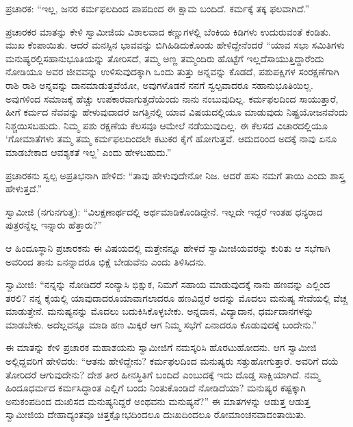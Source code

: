  ಪ್ರಚಾರಕ: “ಇಲ್ಲ, ಜನರ ಕರ್ಮಫಲದಿಂದ ಪಾಪದಿಂದ ಈ ಕ್ಷಾಮ ಬಂದಿದೆ. ಕರ್ಮಕ್ಕೆ ತಕ್ಕ ಫಲವಾಗಿದೆ.” 

 ಪ್ರಚಾರಕರ ಮಾತನ್ನು ಕೇಳಿ ಸ್ವಾಮೀಜಿಯ ವಿಶಾಲವಾದ ಕಣ್ಣುಗಳಲ್ಲಿ ಬೆಂಕಿಯ ಕಿಡಿಗಳು ಉದುರುವಂತೆ ಕಂಡಿತು. ಮುಖ ಕೆಂಪಾಯಿತು. ಆದರೆ ಮನಸ್ಸಿನ ಭಾವವನ್ನು ಬಿಗಿಹಿಡಿದುಕೊಂಡು ಹೇಳಿದ್ದೇನೆಂದರೆ “ಯಾವ ಸಭಾ ಸಮಿತಿಗಳು ಮನುಷ್ಯರಲ್ಲಿ\break ಸಹಾನುಭೂತಿಯನ್ನು ತೋರಿಸದೆ, ತಮ್ಮ ಅಣ್ಣ ತಮ್ಮಂದಿರು ಹೊಟ್ಟೆಗೆ ಇಲ್ಲದೆ\break ಸಾಯುತ್ತಿದ್ದಾರೆಂದು ನೋಡಿಯೂ ಅವರ ಜೀವವನ್ನು ಉಳಿಸುವುದಕ್ಕಾಗಿ ಒಂದು ತುತ್ತು ಅನ್ನವನ್ನು ಕೊಡದೆ, ಪಶುಪಕ್ಷಿಗಳ ಸಂರಕ್ಷಣೆಗಾಗಿ ರಾಶಿ ರಾಶಿ ಅನ್ನವನ್ನು ದಾನಮಾಡುತ್ತವೆಯೋ, ಅವುಗಳೊಡನೆ ನನಗೆ ಸ್ವಲ್ಪವಾದರೂ ಸಹಾನುಭೂತಿಯಿಲ್ಲ. ಅವುಗಳಿಂದ ಸಮಾಜಕ್ಕೆ ಹೆಚ್ಚು ಉಪಕಾರವಾಗುತ್ತದೆಯೆಂದು ನಾನು ನಂಬುವುದಿಲ್ಲ. ಕರ್ಮಫಲದಿಂದ ಸಾಯುತ್ತಾರೆ, ಹೀಗೆ ಕರ್ಮದ ನೆವವನ್ನು ಹೇಳುವುದಾದರೆ ಜಗತ್ತಿನಲ್ಲಿ ಯಾವ ವಿಷಯದಲ್ಲಿಯೂ ಮಾಡುವುದು ನಿಷ್ಪ್ರಯೋಜನವೆಂದು ನಿಶ್ಚಯಿಸಬಹುದು. ನಿಮ್ಮ ಪಶು ರಕ್ಷಣೆಯ ಕೆಲಸವೂ ಆಮೇಲೆ ನಡೆಯುವುದಿಲ್ಲ. ಈ ಕೆಲಸದ ವಿಚಾರದಲ್ಲಿಯೂ ‘ಗೋಮಾತೆಗಳು ತಮ್ಮ ತಮ್ಮ ಕರ್ಮಫಲದಿಂದಲೇ ಕಟುಕರ ಕೈಗೆ ಹೋಗುತ್ತವೆ. ಆದುದರಿಂದ ಅದಕ್ಕೆ ನಾವು ಏನೂ ಮಾಡಬೇಕಾದ ಆವಶ್ಯಕತೆ ಇಲ್ಲ’ ಎಂದು ಹೇಳಬಹುದು.” 

 ಪ್ರಚಾರಕನು ಸ್ವಲ್ಪ ಅಪ್ರತಿಭನಾಗಿ ಹೇಳಿದ: “ತಾವು ಹೇಳುವುದೇನೋ ನಿಜ. ಆದರೆ ಹಸು ನಮಗೆ ತಾಯಿ ಎಂದು ಶಾಸ್ತ್ರ ಹೇಳುತ್ತದೆ.” 

 ಸ್ವಾಮೀಜಿ (ನಗುನಗುತ್ತ): “ವಿಲಕ್ಷಣಾರ್ಥದಲ್ಲಿ ಅರ್ಥಮಾಡಿಕೊಂಡಿದ್ದೇನೆ. ಇಲ್ಲದೇ ಇದ್ದರೆ ಇಂತಹ ಧನ್ಯರಾದ ಪುತ್ರರನ್ನೆಲ್ಲ ಇನ್ನಾರು ಹೆತ್ತಾರು?” 

 ಆ ಹಿಂದೂಸ್ಥಾನಿ ಪ್ರಚಾರಕನು ಈ ವಿಷಯದಲ್ಲಿ ಮತ್ತೇನನ್ನೂ ಹೇಳದೆ ಸ್ವಾಮೀಜಿಯವರನ್ನು ಕುರಿತು ಆ ಸಭೆಗಾಗಿ ಅವರಿಂದ ತಾನು ಏನನ್ನಾದರೂ ಭಿಕ್ಷೆ ಬೇಡುವೆನು ಎಂದು ತಿಳಿಸಿದನು. 

 ಸ್ವಾಮೀಜಿ: “ನನ್ನನ್ನು ನೋಡಿದರೆ ಸಂನ್ಯಾಸಿ ಭಿಕ್ಷುಕ, ನಿಮಗೆ ಸಹಾಯ ಮಾಡುವುದಕ್ಕೆ ನಾನು ಹಣವನ್ನು ಎಲ್ಲಿಂದ ತರಲಿ? ನನ್ನ ಕೈಯಲ್ಲಿ ಯಾವುದಾದರೂ\break ಯಾವಾಗಲಾದರೂ ಹಣವಿದ್ದರೆ ಅದನ್ನು ಮೊದಲು ಮನುಷ್ಯ ಸೇವೆಯಲ್ಲಿ ವೆಚ್ಚ ಮಾಡುತ್ತೇನೆ. ಮನುಷ್ಯನನ್ನು ಮೊದಲು ಬದುಕಿಸಿಕೊಳ್ಳಬೇಕು. ಅನ್ನದಾನ, ವಿದ್ಯಾದಾನ, ಧರ್ಮದಾನಗಳನ್ನು ಮಾಡಬೇಕು. ಅದೆಲ್ಲವನ್ನೂ ಮಾಡಿ ಹಣ ಮಿಕ್ಕರೆ ಆಗ ನಿಮ್ಮ ಸಭೆಗೆ ಏನಾದರೂ ಕೊಡುವುದಕ್ಕೆ ಬಂದೇನು.” 

 ಈ ಮಾತನ್ನು ಕೇಳಿ ಪ್ರಚಾರಕ ಮಹಾಶಯನು ಸ್ವಾಮೀಜಿಗೆ ನಮಸ್ಕರಿಸಿ ಹೊರಟುಹೋದನು. ಆಗ ಸ್ವಾಮೀಜಿ ಅಲ್ಲಿದ್ದವರಿಗೆ ಹೇಳಿದರು: “ಆತನು ಹೇಳಿದ್ದೇನು? ಕರ್ಮಫಲದಿಂದ ಮನುಷ್ಯರು ಸತ್ತುಹೋಗುತ್ತಾರೆ. ಅವರಿಗೆ ದಯೆ ತೋರಿದರೆ ಆಗುವುದೇನು? ದೇಶ ತೀರ ಹೀನಸ್ಥಿತಿಗೆ ಬಂದಿದೆ ಎಂಬುದಕ್ಕೆ ಇದು ದೊಡ್ಡ ಸಾಕ್ಷಿಯಾಗಿದೆ. ನಮ್ಮ ಹಿಂದೂಧರ್ಮದ ಕರ್ಮಸಿದ್ಧಾಂತ ಎಲ್ಲಿಗೆ ಬಂದು ನಿಂತುಕೊಂಡಿದೆ ನೋಡಿದೆಯಾ? ಮನುಷ್ಯರ ಕಷ್ಟಕ್ಕಾಗಿ ಅನುಕಂಪದಿಂದ ದುಃಖಿಸದ ಮನುಷ್ಯನಿದ್ದರೆ ಅಂಥವನು ಮನುಷ್ಯನೆ?” ಈ ಮಾತಗಳನ್ನು ಆಡುತ್ತ ಆಡುತ್ತ ಸ್ವಾಮೀಜಿಯ ದೇಹಾದ್ಯಂತವೂ ಚಿತ್ತಕ್ಷೋಭದಿಂದಲೂ ದುಃಖದಿಂದಲೂ ರೋಮಾಂಚನವಾದಂತಾಯಿತು. 


